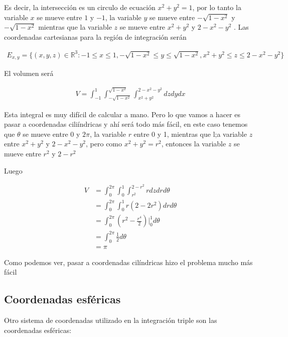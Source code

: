 \documentclass{article}
\theoremstyle{definition}
\begin{document}
Es decir, la intersecci\'on es un circulo de ecuaci\'on $x^2+y^2=1$, por lo tanto la variable $x$ se mueve entre $1$ y $-1$, la variable $y$ se mueve entre $ -\sqrt{1-x^2}$ y  $ -\sqrt{1-x^2}$ mientras que la variable $z$ se mueve entre $x^2+y^2$ y $2-x^2-y^2$ . Las coordenadas cartesianas para la regi\'on de integraci\'on ser\'an

\begin{align*}
    E_{x,y} = \lbrace (x,y,z) \in \mathbb{R}^3 : -1 \leq x \leq 1, -\sqrt{1-x^2} \leq y \leq \sqrt{1-x^2}, x^2+y^2 \leq z \leq 2-x^2-y^2\rbrace
\end{align*}

El volumen ser\'a 

\begin{align*}
    V = \int_{-1}^1\int_{-\sqrt{1-x^2}}^{\sqrt{1-x^2}}\int_{x^2+y^2}^{2-x^2-y^2} dz dy dx
\end{align*}

Esta integral es muy dif\'icil de calcular a mano. Pero lo que vamos a hacer es pasar a coordenadas cili\'indricas y ah\'i ser\'a todo m\'as f\'acil, en este caso tenemos que $\theta$ se mueve entre 0 y $2\pi$, la variable $r$ entre 0 y 1, mientras que l;a variable $z$ entre  $x^2+y^2$ y $2-x^2-y^2$, pero como $x^2+y^2 = r^2$, entonces la variable $z$ se mueve entre  $r^2$ y $2-r^2$



Luego


\begin{align*}
    V &= \int_{0}^{2\pi}\int_{0}^{1}\int_{r^2}^{2-r^2} r dz dr d\theta \\
    &= \int_{0}^{2\pi}\int_{0}^{1} r(2-2r^2)  dr d\theta  \\
    &= \int_{0}^{2\pi} \left( r^2 -\frac{r^4}{2}\right)\bigg|_0^1 d\theta  \\
    &= \int_{0}^{2\pi} \frac{1}{2}d\theta  \\
    &= \pi
\end{align*}    

Como podemos ver, pasar a coordenadas cil\'indricas hizo el problema mucho m\'as f\'acil \\

\subsection{Coordenadas esf\'ericas}

Otro sistema de coordenadas utilizado en la integraci\'on triple son
las coordenadas esf\'ericas:
\end{document}

